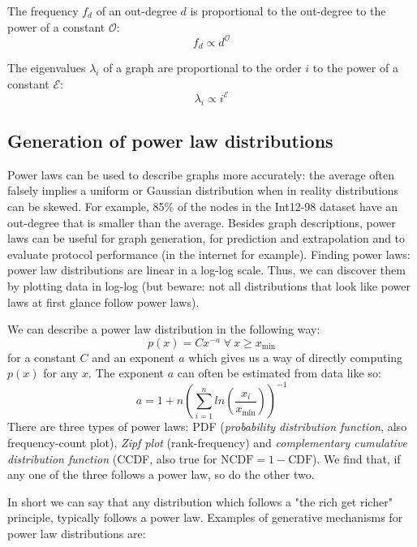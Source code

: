 \begin{theorem}
The frequency $f_d$ of an out-degree $d$ is proportional to the out-degree to the power of a constant $\mathcal{O}$:
$$
f_d \propto d^\mathcal{O}
$$
\end{theorem}

\begin{theorem}
The eigenvalues $\lambda_i$ of a graph are proportional to the order $i$ to the power of a constant $\mathcal{E}$:
$$
\lambda_i \propto i^\mathcal{E}
$$
\end{theorem}

\subsection{Generation of power law distributions}
\bigskip

Power laws can be used to describe graphs more accurately: the average often falsely implies a uniform or Gaussian distribution when in reality distributions can be skewed. For example, 85\% of the nodes in the Int12-98 dataset have an out-degree that is smaller than the average. Besides graph descriptions, power laws can be useful for graph generation, for prediction and extrapolation and to evaluate protocol performance (in the internet for example). Finding power laws: power law distributions are linear in a log-log scale. Thus, we can discover them by plotting data in log-log (but beware: not all distributions that look like power laws at first glance follow power laws).

We can describe a power law distribution in the following way:
$$
p(x) = Cx^{-a} \; \forall \ x \geq x_{\text{min}}
$$
for a constant $C$ and an exponent $a$ which gives us a way of directly computing $p(x)$ for any $x$. The exponent $a$ can often be estimated from data like so:
$$
a = 1 + n \left( \sum_{i=1}^n ln \left( \frac{x_i}{x_\text{min}} \right) \right)^{-1}
$$
There are three types of power laws: PDF (\emph{probability distribution function}, also frequency-count plot), 
\emph{Zipf plot} (rank-frequency) and \emph{complementary cumulative distribution function} (CCDF, also true for $\text{NCDF} = 1 - \text{CDF}$). We find that, if any one of the three follows a power law, so do the other two.

In short we can say that any distribution which follows a "the rich get richer" principle, typically follows a power law. Examples of generative mechanisms for power law distributions are:

